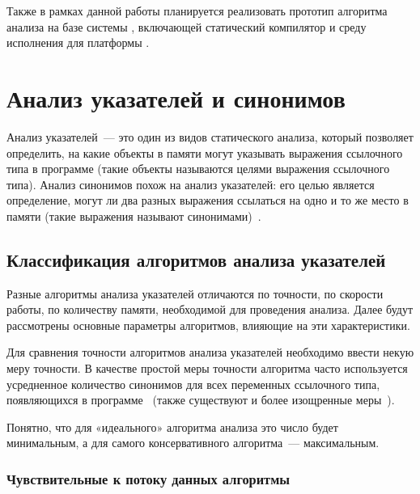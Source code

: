 \documentclass[14pt,titlepage,draft]{extarticle}
\begin{document}
    Также в рамках данной работы планируется реализовать прототип алгоритма
    анализа на базе системы ,
    включающей статический компилятор и среду исполнения для платформы
    .

  \section{Анализ указателей и синонимов}

    Анализ указателей~--- это один из видов статического анализа, который
    позволяет определить, на какие объекты в памяти могут указывать выражения
    ссылочного типа в программе (такие объекты называются целями выражения
    ссылочного типа). Анализ синонимов похож на анализ указателей: его целью
    является определение, могут ли два разных выражения ссылаться на одно и
    то же место в памяти (такие выражения называют синонимами)~\cite{andersen}.

    \subsection{Классификация алгоритмов анализа указателей}
    \label{section:analysis_classification}

      Разные алгоритмы анализа указателей отличаются по точности, по скорости
      работы, по количеству памяти, необходимой для проведения анализа.
      Далее будут рассмотрены основные параметры алгоритмов, влияющие на эти
      характеристики.

      Для сравнения точности алгоритмов анализа указателей необходимо ввести
      некую меру точности. В качестве простой меры точности алгоритма часто
      используется усредненное количество синонимов для всех переменных
      ссылочного типа, появляющихся в
      программе~\cite[раздел~3.2]{hind_pointer_analysis_not_solved_yet}
      (также существуют и более изощренные
      меры~\cite{hind_pointer_analysis_not_solved_yet,diwan_tbaa}).

      Понятно, что для «идеального» алгоритма анализа это число будет
      минимальным, а для самого консервативного алгоритма~--- максимальным.

      \subsubsection{Чувствительные к потоку данных алгоритмы}
        \label{section:analysis_classification_data_flow}
\end{document}
